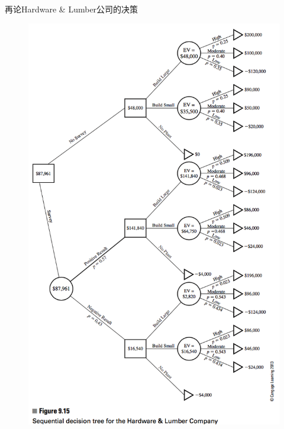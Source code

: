 \documentclass[mathserif, table]{beamer}
\begin{document}
\begin{frame}{再论Hardware \& Lumber公司的决策}
  
  \begin{figure}
    \includegraphics[height=0.8\textheight{}]{9_15.png}
  \end{figure}

\end{frame}
\end{document}
